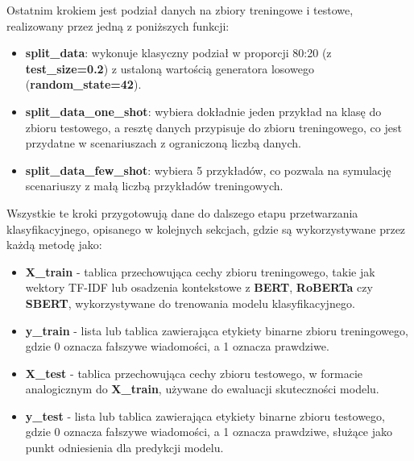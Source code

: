 Ostatnim krokiem jest podział danych na zbiory treningowe i testowe, realizowany przez jedną z poniższych funkcji:
\begin{itemize}
	\item \textbf{split\_data}:
	      wykonuje klasyczny podział w proporcji 80:20 (z \textbf{test\_size=0.2}) z ustaloną wartością generatora losowego (\textbf{random\_state=42}).
	\item \textbf{split\_data\_one\_shot}:
	      wybiera dokładnie jeden przykład na klasę do zbioru testowego, a resztę danych przypisuje do zbioru treningowego, co jest przydatne w scenariuszach z ograniczoną liczbą danych.
	\item \textbf{split\_data\_few\_shot}: wybiera 5 przykładów, co pozwala na symulację scenariuszy z małą liczbą przykładów treningowych.
\end{itemize}
Wszystkie te kroki przygotowują dane do dalszego etapu przetwarzania klasyfikacyjnego, opisanego w kolejnych sekcjach, gdzie są wykorzystywane przez każdą metodę jako:
\begin{itemize}
	\item \textbf{X\_train} - tablica przechowująca cechy zbioru treningowego, takie jak wektory TF-IDF lub osadzenia kontekstowe z \textbf{BERT}, \textbf{RoBERTa} czy \textbf{SBERT}, wykorzystywane do trenowania modelu klasyfikacyjnego.
	\item \textbf{y\_train} - lista lub tablica zawierająca etykiety binarne zbioru treningowego, gdzie 0 oznacza fałszywe wiadomości, a 1 oznacza prawdziwe.
	\item \textbf{X\_test} - tablica przechowująca cechy zbioru testowego, w formacie analogicznym do \textbf{X\_train}, używane do ewaluacji skuteczności modelu.
	\item \textbf{y\_test} - lista lub tablica zawierająca etykiety binarne zbioru testowego, gdzie 0 oznacza fałszywe wiadomości, a 1 oznacza prawdziwe, służące jako punkt odniesienia dla predykcji modelu.
\end{itemize}